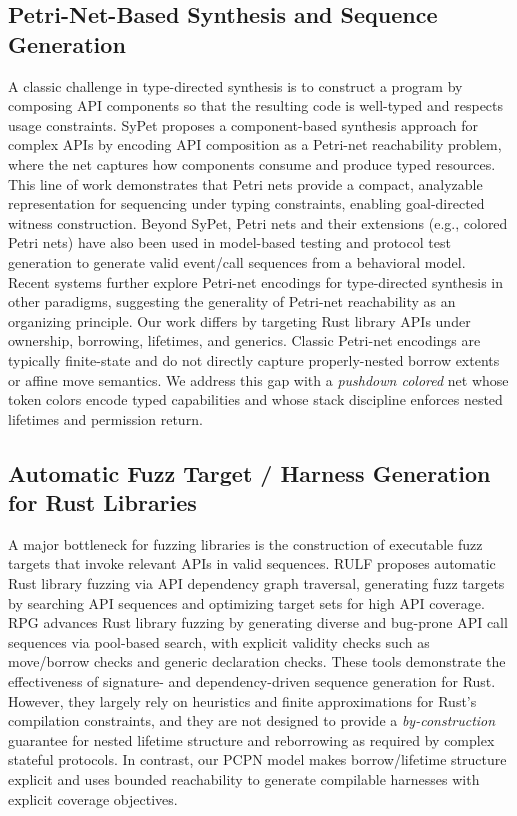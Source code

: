 \documentclass[sigconf]{acmart}
\begin{document}
\subsection{Petri-Net-Based Synthesis and Sequence Generation}
A classic challenge in type-directed synthesis is to construct a program by composing API components so that the resulting code is well-typed and respects usage constraints.
SyPet proposes a component-based synthesis approach for complex APIs by encoding API composition as a Petri-net reachability problem, where the net captures how components consume and produce typed resources. This line of work demonstrates that Petri nets provide a compact, analyzable representation for sequencing under typing constraints, enabling goal-directed witness construction. Beyond SyPet, Petri nets and their extensions (e.g., colored Petri nets) have also been used in model-based testing and protocol test generation to generate valid event/call sequences from a behavioral model.
Recent systems further explore Petri-net encodings for type-directed synthesis in other paradigms, suggesting the generality of Petri-net reachability as an organizing principle. Our work differs by targeting Rust library APIs under ownership, borrowing, lifetimes, and generics. Classic Petri-net encodings are typically finite-state and do not directly capture properly-nested borrow extents
or affine move semantics. We address this gap with a \emph{pushdown colored} net whose token colors encode typed capabilities and whose stack discipline enforces nested lifetimes and permission return.

\subsection{Automatic Fuzz Target / Harness Generation for Rust Libraries}
A major bottleneck for fuzzing libraries is the construction of executable fuzz targets that
invoke relevant APIs in valid sequences. RULF proposes automatic Rust library fuzzing via API dependency graph traversal, generating fuzz targets by searching API sequences and optimizing target sets for high API coverage.
RPG advances Rust library fuzzing by generating diverse and bug-prone API call sequences via pool-based search, with explicit validity checks such as move/borrow checks and generic declaration checks. These tools demonstrate the effectiveness of signature- and dependency-driven sequence generation for Rust. However, they largely rely on heuristics and finite approximations for Rust's compilation constraints, and they are not designed to provide a \emph{by-construction} guarantee for nested lifetime structure and reborrowing
as required by complex stateful protocols. In contrast, our PCPN model makes borrow/lifetime structure explicit and uses bounded reachability to generate compilable harnesses with explicit coverage objectives.
\end{document}
